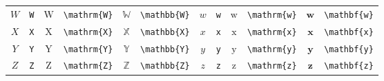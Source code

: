 \begin{table}[th]
\begin{tabular}{ c@{ }l c@{ }l c@{ }l c@{ }l c@{ }l c@{ }l}
		$W$ & \verb|W| & $\mathrm{W}$ & \verb|\mathrm{W}| & $\mathbb{W}$ & \verb|\mathbb{W}| & $w$ & \verb|w| & $\mathrm{w}$ & \verb|\mathrm{w}| & $\mathbf{w}$ & \verb|\mathbf{w}| \\
		$X$ & \verb|X| & $\mathrm{X}$ & \verb|\mathrm{X}| & $\mathbb{X}$ & \verb|\mathbb{X}| & $x$ & \verb|x| & $\mathrm{x}$ & \verb|\mathrm{x}| & $\mathbf{x}$ & \verb|\mathbf{x}| \\
		$Y$ & \verb|Y| & $\mathrm{Y}$ & \verb|\mathrm{Y}| & $\mathbb{Y}$ & \verb|\mathbb{Y}| & $y$ & \verb|y| & $\mathrm{y}$ & \verb|\mathrm{y}| & $\mathbf{y}$ & \verb|\mathbf{y}| \\
		$Z$ & \verb|Z| & $\mathrm{Z}$ & \verb|\mathrm{Z}| & $\mathbb{Z}$ & \verb|\mathbb{Z}| & $z$ & \verb|z| & $\mathrm{z}$ & \verb|\mathrm{z}| & $\mathbf{z}$ & \verb|\mathbf{z}| \\
		\hline
	\end{tabular}
\end{table}

%

\newpage
